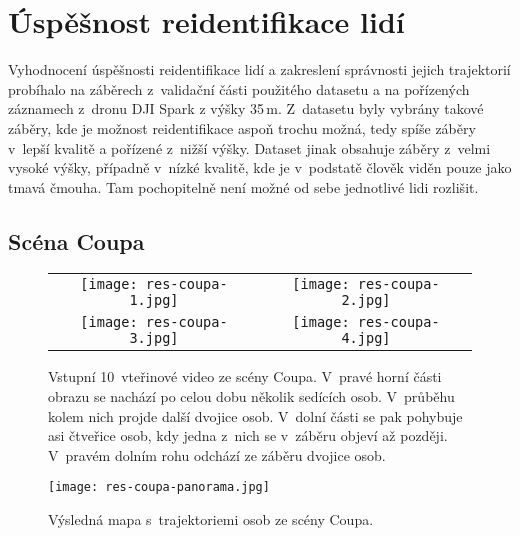 

\section{Úspěšnost reidentifikace lidí}
\label{sec_reidentification_results}

Vyhodnocení úspěšnosti reidentifikace lidí a zakreslení správnosti jejich trajektorií probíhalo na záběrech z~validační části použitého datasetu a na pořízených záznamech z~dronu DJI Spark z výšky 35\,m. Z~datasetu byly vybrány takové záběry, kde je možnost reidentifikace aspoň trochu možná, tedy spíše záběry v~lepší kvalitě a pořízené z~nižší výšky. Dataset jinak obsahuje záběry z~velmi vysoké výšky, případně v~nízké kvalitě, kde je v~podstatě člověk viděn pouze jako tmavá čmouha. Tam pochopitelně není možné od sebe jednotlivé lidi rozlišit.


\subsection*{Scéna Coupa}

\begin{figure}[H]
    \begin{tabular}{cc}
        \texttt{[image: res-coupa-1.jpg]} &
        \texttt{[image: res-coupa-2.jpg]} \\
        \texttt{[image: res-coupa-3.jpg]} &
        \texttt{[image: res-coupa-4.jpg]} \\
    \end{tabular}
    \caption[Otestování algoritmu na scéně Coupa]{Vstupní 10~vteřinové video ze scény Coupa. V~pravé horní části obrazu se nachází po celou dobu několik sedících osob. V~průběhu kolem nich projde další dvojice osob. V~dolní části se pak pohybuje asi čtveřice osob, kdy jedna z~nich se v~záběru objeví až později. V~pravém dolním rohu odchází ze záběru dvojice osob.}
\end{figure}

\begin{figure}[H]
    \centering
    \texttt{[image: res-coupa-panorama.jpg]}
    \caption[Výsledná mapa s~trajektoriemi osob ze scény Coupa]{Výsledná mapa s~trajektoriemi osob ze scény Coupa. }
\end{figure}

